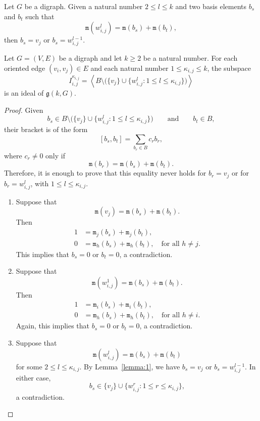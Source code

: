 \documentclass[10pt,a4paper]{amsart}
\newcommand{\g}{\mathfrak{g}}
\newcommand{\mult}{\mathtt{m}}
\begin{document}
\begin{lemma}\label{lemma:1}
Let $G$ be a digraph. Given a natural number $2\leq l\leq k$ and two basis elements $b_s$ and $b_t$ such that
\[
\mult(w_{i,j}^l)=\mult(b_s)+\mult(b_t),
\]
then $b_s=v_j$ or $b_s=w_{i,j}^{l-1}$.
\end{lemma}

\begin{proposition}
Let $G=(V,E)$ be a digraph and let $k\ge 2$ be a natural number. 
For each oriented edge $(v_i,v_j)\in E$ and each natural number $1\leq \kappa_{i,j}\leq k$, the subspace
\[
I_{i,j}^{\kappa_{i,j}}=
\left\langle B\setminus\big(\{v_j\}\cup\{w_{i,j}^l: 1\leq l\leq \kappa_{i,j}\}\big)\right\rangle
\]
is an ideal of $\g(k,G)$.
\end{proposition}

\begin{proof}
Given
\[
b_s\in B\setminus\big(\{v_j\}\cup\{w_{i,j}^l: 1\leq l\leq \kappa_{i,j}\}\big)
\qquad\text{and}\qquad
b_t\in B,
\]
their bracket is of the form
\[
[b_s,b_t]=\sum_{b_r\in B} c_r b_r,
\]
where $c_r\ne 0$ only if
\[
\mult(b_r)= \mult(b_s)+\mult(b_t).
\]
Therefore, it is enough to prove that this equality never holds for $b_r=v_j$ or for $b_r=w_{i,j}^l$, with $1\leq l\leq \kappa_{i,j}$.

\begin{enumerate}
\item Suppose that
\[
\mult(v_j)=\mult(b_s)+\mult(b_t).
\]
Then
\begin{align*}
1&=\mult_j(b_s)+\mult_j(b_t),\\
0&=\mult_h(b_s)+\mult_h(b_t), \quad \text{for all } h\neq j.
\end{align*}
This implies that $b_s=0$ or $b_t=0$, a contradiction.

\item Suppose that
\[
\mult(w_{i,j}^1)=\mult(b_s)+\mult(b_t).
\]
Then
\begin{align*}
1&=\mult_i(b_s)+\mult_i(b_t),\\
0&=\mult_h(b_s)+\mult_h(b_t), \quad \text{for all } h\neq i.
\end{align*}
Again, this implies that $b_s=0$ or $b_t=0$, a contradiction.

\item Suppose that
\[
\mult(w_{i,j}^l)=\mult(b_s)+\mult(b_t)
\]
for some $2\leq l\leq \kappa_{i,j}$. By Lemma~\ref{lemma:1}, we have $b_s=v_j$ or $b_s=w_{i,j}^{l-1}$. In either case,
\[
b_s\in \{v_j\}\cup\{w_{i,j}^r: 1\leq r\leq \kappa_{i,j}\},
\]
a contradiction.
\end{enumerate}
\end{proof}
\end{document}
